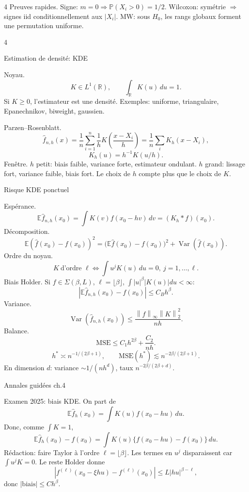 \documentclass[10pt]{article}
\newcommand{\E}{\mathbb E}
\newcommand{\V}{\operatorname{Var}}
\newcommand{\R}{\mathbb R}
\newcommand{\Prob}{\mathbb P}
\newcommand{\norm}[1]{\left\lVert #1\right\rVert}
\newcommand{\boxhead}[1]{%
  \vspace{2pt}\par\noindent #1\par\vspace{1pt}}
\newcommand{\tinytitle}[1]{#1.}
\begin{document}
\begin{multicols*}{4}
\tinytitle{Preuves rapides}
Signe: \(m=0\Rightarrow\Prob(X_i>0)=1/2\). Wilcoxon: symétrie \(\Rightarrow\) signes iid conditionnellement aux \(|X_i|\). MW: sous \(H_0\), les rangs globaux forment une permutation uniforme.

\end{multicols*}

\newpage
\fontsize{5.9}{6.5}\selectfont

\begin{multicols*}{4}

\boxhead{Estimation de densité: KDE}
\tinytitle{Noyau}
\[
K\in L^1(\R),\qquad \int_\R K(u)\,du=1.
\]
Si \(K\ge0\), l'estimateur est une densité. Exemples: uniforme, triangulaire, Epanechnikov, biweight, gaussien.

\tinytitle{Parzen--Rosenblatt}
\[
\widehat f_{n,h}(x)=\frac1n\sum_{i=1}^n\frac1h
K\!\left(\frac{x-X_i}{h}\right)=\frac1n\sum_iK_h(x-X_i),
\]
\[
K_h(u)=h^{-1}K(u/h).
\]
\tinytitle{Fenêtre} \(h\) petit: biais faible, variance forte, estimateur ondulant. \(h\) grand: lissage fort, variance faible, biais fort. Le choix de \(h\) compte plus que le choix de \(K\).

\boxhead{Risque KDE ponctuel}
\tinytitle{Espérance}
\[
\E\widehat f_{n,h}(x_0)=\int K(v)f(x_0-hv)\,dv
=(K_h*f)(x_0).
\]
\tinytitle{Décomposition}
\[
\E(\widehat f(x_0)-f(x_0))^2=
\big(\E\widehat f(x_0)-f(x_0)\big)^2+\V(\widehat f(x_0)).
\]
\tinytitle{Ordre du noyau}
\[
K\ \text{d'ordre }\ell
\Longleftrightarrow
\int u^jK(u)\,du=0,\ j=1,\ldots,\ell.
\]
\tinytitle{Biais Holder} Si \(f\in\Sigma(\beta,L)\), \(\ell=\lfloor\beta\rfloor\), \(\int |u|^\beta|K(u)|du<\infty\):
\[
\left|\E\widehat f_{n,h}(x_0)-f(x_0)\right|
\le C_Bh^\beta.
\]
\tinytitle{Variance}
\[
\V(\widehat f_{n,h}(x_0))
\le \frac{\norm{f}_\infty\norm K_2^2}{nh}.
\]
\tinytitle{Balance}
\[
\mathrm{MSE}\le C_1h^{2\beta}+\frac{C_2}{nh}.
\]
\[
h^*\asymp n^{-1/(2\beta+1)},\qquad
\mathrm{MSE}(h^*)\lesssim n^{-2\beta/(2\beta+1)}.
\]
En dimension \(d\): variance \(\sim1/(nh^d)\), taux \(n^{-2\beta/(2\beta+d)}\).

\boxhead{Annales guidées ch.4}
\tinytitle{Examen 2025: biais KDE}
On part de
\[
\E\widehat f_h(x_0)=\int K(u)f(x_0-hu)\,du.
\]
Donc, comme \(\int K=1\),
\[
\E\widehat f_h(x_0)-f(x_0)
=\int K(u)\{f(x_0-hu)-f(x_0)\}\,du.
\]
Rédaction: faire Taylor à l'ordre \(\ell=\lfloor\beta\rfloor\). Les termes en \(u^j\) disparaissent car \(\int u^jK=0\). Le reste Holder donne
\[
|f^{(\ell)}(x_0-\xi hu)-f^{(\ell)}(x_0)|
\le L|hu|^{\beta-\ell},
\]
donc \(|\mathrm{biais}|\le C h^\beta\).


\end{multicols*}
\end{document}
